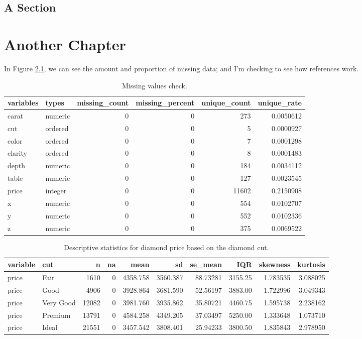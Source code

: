 \documentclass[
    numbers=noenddot,
    open=any,
    paper=a4,
    oneside,
    pagesize,
    captions=tableabove,
    bibliography=totoc,
    11pt
    ]{scrbook}
\begin{document}
\hypertarget{a-section}{%
\section{A Section}\label{a-section}}

\hypertarget{another-chapter}{%
\chapter{Another Chapter}\label{another-chapter}}

In Figure \ref{tab:dlookrdiag}, we can see the amount and proportion of
missing data; and I'm checking to see how references work.

\begin{table}[!h]

\caption{\label{tab:dlookrdiag}Missing values check.}
\centering
\begin{tabular}[t]{llrrrr}
\toprule
variables & types & missing\_count & missing\_percent & unique\_count & unique\_rate\\
\midrule
carat & numeric & 0 & 0 & 273 & 0.0050612\\
cut & ordered & 0 & 0 & 5 & 0.0000927\\
color & ordered & 0 & 0 & 7 & 0.0001298\\
clarity & ordered & 0 & 0 & 8 & 0.0001483\\
depth & numeric & 0 & 0 & 184 & 0.0034112\\
\addlinespace
table & numeric & 0 & 0 & 127 & 0.0023545\\
price & integer & 0 & 0 & 11602 & 0.2150908\\
x & numeric & 0 & 0 & 554 & 0.0102707\\
y & numeric & 0 & 0 & 552 & 0.0102336\\
z & numeric & 0 & 0 & 375 & 0.0069522\\
\bottomrule
\end{tabular}
\end{table}

\begin{table}[!h]

\caption{\label{tab:dlookrdesc}Descriptive statistics for diamond price based on the diamond cut.}
\centering
\begin{tabular}[t]{llrrrrrrrr}
\toprule
variable & cut & n & na & mean & sd & se\_mean & IQR & skewness & kurtosis\\
\midrule
price & Fair & 1610 & 0 & 4358.758 & 3560.387 & 88.73281 & 3155.25 & 1.783535 & 3.088025\\
price & Good & 4906 & 0 & 3928.864 & 3681.590 & 52.56197 & 3883.00 & 1.722996 & 3.049343\\
price & Very Good & 12082 & 0 & 3981.760 & 3935.862 & 35.80721 & 4460.75 & 1.595738 & 2.238162\\
price & Premium & 13791 & 0 & 4584.258 & 4349.205 & 37.03497 & 5250.00 & 1.333648 & 1.073710\\
price & Ideal & 21551 & 0 & 3457.542 & 3808.401 & 25.94233 & 3800.50 & 1.835843 & 2.978950\\
\bottomrule
\end{tabular}
\end{table}
\end{document}
